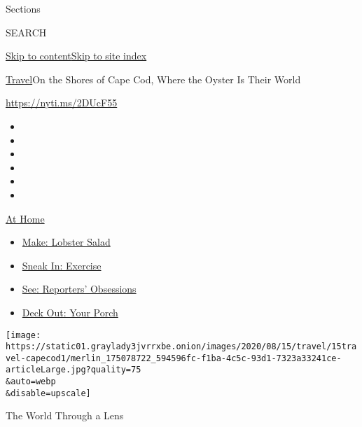 Sections

SEARCH

\protect\hyperlink{site-content}{Skip to
content}\protect\hyperlink{site-index}{Skip to site index}

\href{/section/travel}{Travel}\textbar{}On the Shores of Cape Cod, Where
the Oyster Is Their World

\url{https://nyti.ms/2DUcF55}

\begin{itemize}
\item
\item
\item
\item
\item
\item
\end{itemize}

\href{https://www.nytimes3xbfgragh.onion/spotlight/at-home?action=click\&pgtype=Article\&state=default\&region=TOP_BANNER\&context=at_home_menu}{At
Home}

\begin{itemize}
\tightlist
\item
  \href{https://www.nytimes3xbfgragh.onion/2020/08/14/dining/lobster-salad-recipe.html?action=click\&pgtype=Article\&state=default\&region=TOP_BANNER\&context=at_home_menu}{Make:
  Lobster Salad}
\item
  \href{https://www.nytimes3xbfgragh.onion/2020/08/15/at-home/coronavirus-at-home-quick-exercises.html?action=click\&pgtype=Article\&state=default\&region=TOP_BANNER\&context=at_home_menu}{Sneak
  In: Exercise}
\item
  \href{https://www.nytimes3xbfgragh.onion/interactive/2020/at-home/even-more-reporters-editors-diaries-lists-recommendations.html?action=click\&pgtype=Article\&state=default\&region=TOP_BANNER\&context=at_home_menu}{See:
  Reporters' Obsessions}
\item
  \href{https://www.nytimes3xbfgragh.onion/2020/08/15/at-home/coronavirus-fall-patio-furniture.html?action=click\&pgtype=Article\&state=default\&region=TOP_BANNER\&context=at_home_menu}{Deck
  Out: Your Porch}
\end{itemize}

\texttt{[image: https://static01.graylady3jvrrxbe.onion/images/2020/08/15/travel/15travel-capecod1/merlin\_175078722\_594596fc-f1ba-4c5c-93d1-7323a33241ce-articleLarge.jpg?quality=75\\\&auto=webp\\\&disable=upscale]}

The World Through a Lens

